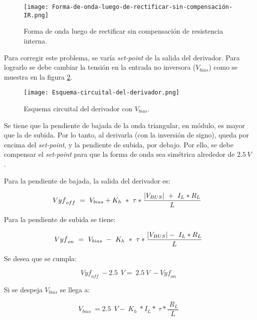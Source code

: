 \begin{figure}[H]
	\centering
	\texttt{[image: Forma-de-onda-luego-de-rectificar-sin-compensación-IR.png]}
	\caption{Forma de onda luego de rectificar sin compensación de resistencia interna.}
	\label{fig:img_Forma-de-onda-luego-de-rectificar-sin-compensación-IR}
\end{figure}

\noindent Para corregir este problema, se varía \textsl{set-point} de la salida del derivador. Para lograrlo se debe cambiar la tensi\'{o}n en la entrada no inversora ($V_{bias}$) como se muestra en la figura \ref{fig:img_Esquema-circuital-del-derivador}. 

\begin{figure}[H]
	\centering
	\texttt{[image: Esquema-circuital-del-derivador.png]}
	\caption{Esquema circuital del derivador con $V_{bias}$.}
	\label{fig:img_Esquema-circuital-del-derivador}
\end{figure}

\noindent Se tiene que la pendiente de bajada de la onda triangular, en m\'{o}dulo, es mayor que la de subida. Por lo tanto, al derivarla (con la inversi\'{o}n de signo), queda por encima del \textsl{set-point}, y la pendiente de subida, por debajo. Por ello, se debe compensar el \textsl{set-point} para que la forma de onda sea sim\'{e}trica alrededor de $2.5\:V$. 

\noindent Para la pendiente de bajada, la salida del derivador es:

\begin{equation} \label{eq_Vyf-Vbias}
	{Vyf}_{off}\ =\ V_{bias}+K_h\ *\ \tau *\frac{\abs{V_{BUS}}\ +\ I_L*R_L}{L}\ 
\end{equation}

\noindent Para la pendiente de subida se tiene:

\begin{equation} \label{eq_Vyf-Vbias2}
	{Vyf}_{on}\ =\ V_{bias}\ -\ K_h\ *\ \tau *\frac{\abs{V_{BUS}} -\ I_L*R_L}{L}
\end{equation}

\noindent Se desea que se cumpla:

\begin{equation} \label{eq_Vyf_Vbias3}
	{Vyf}_{off}\ -2.5\ \:V=\ 2.5\ V\ -{Vyf}_{on}
\end{equation}

\noindent Si se despeja $V_{bias}$ se llega a:

\begin{equation} \label{eq_Vyf-Vbias4}
	V_{bias}\ =2.5\ \:V -\ K_h\ *I_L*\ \tau *\frac{\ R_L}{L}
\end{equation}

